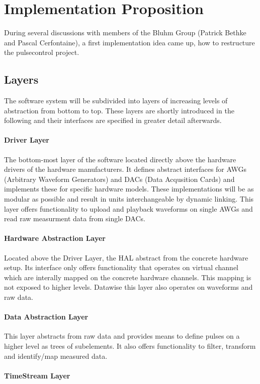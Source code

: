 \documentclass[a4paper,12pt]{article}
\begin{document}
\section{Implementation Proposition}
\label{sec:Proposition}
During several discussions with members of the Bluhm Group (Patrick Bethke and Pascal Cerfontaine), a first implementation idea came up, how to restructure the pulsecontrol project.  

\subsection{Layers}
The software system will be subdivided into layers of increasing levels of abstraction from bottom to top. These layers are shortly introduced in the following and their interfaces are specified in greater detail afterwards.
\paragraph{Driver Layer} The bottom-most layer of the software located directly above the hardware drivers of the hardware manufacturers. It defines abstract interfaces for AWGs (Arbitrary Waveform Generators) and DACs (Data Acqusition Cards) and implements these for specific hardware models. These implementations will be as modular as possible and result in units interchangeable by dynamic linking. This layer offers functionality to upload and playback waveforms on single AWGs and read raw measurment data from single DACs.
\paragraph{Hardware Abstraction Layer} Located above the Driver Layer, the HAL abstract from the concrete hardware setup. Its interface only offers functionality that operates on virtual channel which are interally mapped on the concrete hardware channels. This mapping is not exposed to higher levels. Datawise this layer also operates on waveforms and raw data.
\paragraph{Data Abstraction Layer} This layer abstracts from raw data and provides means to define pulses on a higher level as trees of subelements. It also offers functionality to filter, transform and identify/map measured data.
\paragraph{TimeStream Layer}
\end{document}
